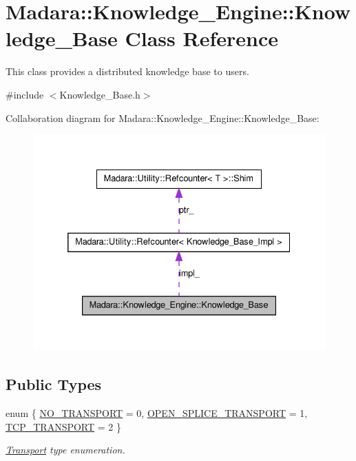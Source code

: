\hypertarget{classMadara_1_1Knowledge__Engine_1_1Knowledge__Base}{
\section{Madara::Knowledge\_\-Engine::Knowledge\_\-Base Class Reference}
\label{df/d02/classMadara_1_1Knowledge__Engine_1_1Knowledge__Base}
}


This class provides a distributed knowledge base to users.  




{\ttfamily \#include $<$Knowledge\_\-Base.h$>$}



Collaboration diagram for Madara::Knowledge\_\-Engine::Knowledge\_\-Base:
\nopagebreak
\begin{figure}[H]
\begin{center}
\leavevmode
\includegraphics[width=332pt]{d8/d49/classMadara_1_1Knowledge__Engine_1_1Knowledge__Base__coll__graph}
\end{center}
\end{figure}
\subsection*{Public Types}
\begin{DoxyCompactItemize}
\item 
enum \{ \hyperlink{classMadara_1_1Knowledge__Engine_1_1Knowledge__Base_a509265a70e9c117d273fcb33fc7815a8a6c25e2115c114e112a691f19e1445a29}{NO\_\-TRANSPORT} =  0, 
\hyperlink{classMadara_1_1Knowledge__Engine_1_1Knowledge__Base_a509265a70e9c117d273fcb33fc7815a8a954c7c0a6aa7ffd684ab0768d610f5dc}{OPEN\_\-SPLICE\_\-TRANSPORT} =  1, 
\hyperlink{classMadara_1_1Knowledge__Engine_1_1Knowledge__Base_a509265a70e9c117d273fcb33fc7815a8aafacafa9caa135a04478eb7496c6ae5b}{TCP\_\-TRANSPORT} =  2
 \}
\begin{DoxyCompactList}\small\item\em \hyperlink{namespaceMadara_1_1Transport}{Transport} type enumeration. \item\end{DoxyCompactList}\end{DoxyCompactItemize}
